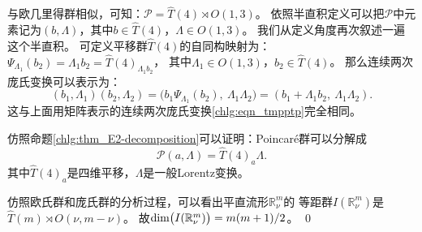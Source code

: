 与欧几里得群相似，可知：$\mathcal{P}= \hat{T}(4) \rtimes O(1,3)$。
依照半直积定义可以把$\mathcal{P}$中元素记为$(b,\Lambda)$，其中$b\in \hat{T}(4)$，$\Lambda\in O(1,3)$。
我们从定义角度再次叙述一遍这个半直积。
可定义平移群$\hat{T}(4)$的自同构映射为：
$\Psi_{\Lambda_1}( b_2)=\Lambda_1 b_2 = \hat{T}(4)_{\Lambda_1 b_2}$，
其中$\Lambda_1 \in O(1,3)$，$b_2\in \hat{T}(4)$。
那么连续两次庞氏变换可以表示为：
\begin{equation}\label{chlg:eqn_ptp}
    (b_1, \Lambda_1)(b_2, \Lambda_2)
    =\bigl(b_1 \Psi_{\Lambda_1}( b_2),\ \Lambda_1 \Lambda_2 \bigr)
    =(b_1 + \Lambda_1 b_2 ,\ \Lambda_1 \Lambda_2) .
\end{equation}
这与上面用矩阵表示的连续两次庞氏变换\eqref{chlg:eqn_tmpptp}完全相同。

仿照命题\ref{chlg:thm_E2-decomposition}可以证明：Poincar\'{e}群可以分解成
\begin{equation}\label{chlg:eqn_PL-decomposition}
    \mathcal{P}(a,\Lambda)= \hat{T}(4)_{a} \Lambda .
\end{equation}
其中$\hat{T}(4)_{a}$是四维平移，$\Lambda$是一般Lorentz变换。



\begin{example}\label{chlg:exm_Rmnu}
    仿照欧氏群和庞氏群的分析过程，可以看出平直流形$\mathbb{R}^m_\nu$的
    等距群$I(\mathbb{R}^m_\nu)$是$\hat{T}(m)\rtimes O(\nu,m-\nu)$。
    故${\rm dim}\bigl(I(\mathbb{R}^m_\nu)\bigr)= m(m+1)/2 $。    \qed
\end{example}


